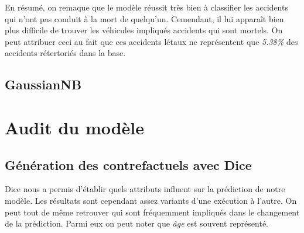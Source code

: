 \documentclass[]{article}
\begin{document}
    En résumé, on remaque que le modèle réussit très bien à classifier les accidents qui n'ont pas conduit à la mort de quelqu'un. Cemendant,
    il lui apparaît bien plus difficile de trouver les véhicules impliqués accidents qui sont mortels. On peut attribuer ceci au fait que
    ces accidents létaux ne représentent que \textit{5.38\%} des accidents rétertoriés dans la base.
    
    \subsection{GaussianNB}


    \section{Audit du modèle}

    \subsection{Génération des contrefactuels avec Dice}
    Dice nous a permis d'établir quels attributs influent sur la prédiction de notre modèle. Les résultats sont 
    cependant assez variants d'une exécution à l'autre. On peut tout de même retrouver qui sont fréquemment impliqués 
    dans le changement de la prédiction.
    Parmi eux on peut noter que \textit{âge} est souvent représenté.
\end{document}
